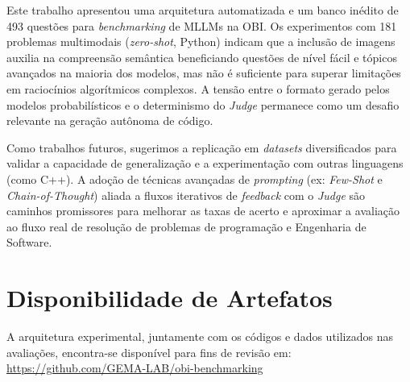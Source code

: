 \documentclass[sigconf]{acmart}
\begin{document}
Este trabalho apresentou uma arquitetura automatizada e um banco inédito de 493 questões para \textit{benchmarking} de MLLMs na OBI. Os experimentos com 181 problemas multimodais (\textit{zero-shot}, Python) indicam que a inclusão de imagens auxilia na compreensão semântica beneficiando questões de nível fácil e tópicos avançados na maioria dos modelos, mas não é suficiente para superar limitações em raciocínios algorítmicos complexos. A tensão entre o formato gerado pelos modelos probabilísticos e o determinismo do \textit{Judge} permanece como um desafio relevante na geração autônoma de código.

Como trabalhos futuros, sugerimos a replicação em \textit{datasets} diversificados para validar a capacidade de generalização e a experimentação com outras linguagens (como C++). A adoção de técnicas avançadas de \textit{prompting} (ex: \textit{Few-Shot} e \textit{Chain-of-Thought}) aliada a fluxos iterativos de \textit{feedback} com o \textit{Judge} são caminhos promissores para melhorar as taxas de acerto e aproximar a avaliação ao fluxo real de resolução de problemas de programação e Engenharia de Software.


\section*{Disponibilidade de Artefatos}

A arquitetura experimental, juntamente com os códigos e dados utilizados nas avaliações, encontra-se disponível para fins de revisão em: \url{https://github.com/GEMA-LAB/obi-benchmarking}



\end{document}
